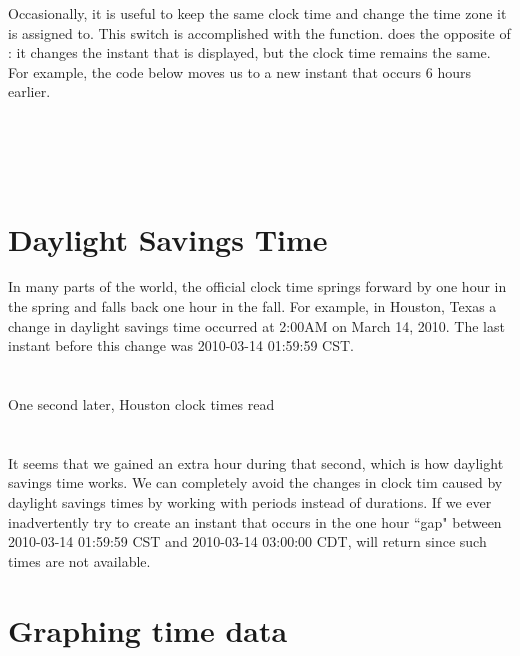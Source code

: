\documentclass[article]{jss}
\begin{document}
Occasionally, it is useful to keep the same clock time and change the time zone it is assigned to. This switch is accomplished with the  function.  does the opposite of : it changes the instant that is displayed, but the clock time remains the same. For example, the code below moves us to a new instant that occurs 6 hours earlier.\\

\\
\\
\\
\\


\section{Daylight Savings Time}
\label{sec:DST}

In many parts of the world, the official clock time springs forward by one hour in the spring and falls back one hour in the fall. For example, in Houston, Texas a change in daylight savings time occurred at 2:00AM on March 14, 2010. The last instant before this change was 2010-03-14 01:59:59 CST.\\

\\
\\

One second later, Houston clock times read\\

\\
\\

It seems that we gained an extra hour during that second, which is how daylight savings time works. We can completely avoid the changes in clock tim caused by daylight savings times by working with periods instead of durations. If we ever inadvertently try to create an instant that occurs in the one hour ``gap" between 2010-03-14 01:59:59 CST  and 2010-03-14 03:00:00 CDT,  will return  since such times are not available.

\section{Graphing time data}
\label{sec:pretty}
\end{document}

